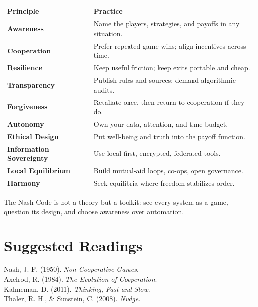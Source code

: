 \documentclass[12pt,twoside]{book}
\begin{document}
\begingroup
\small
\setlength{\tabcolsep}{6pt}
\renewcommand{\arraystretch}{1.15}

\begin{tcolorbox}[enhanced, colback=gray!5, colframe=gray!60,
  boxrule=0.4pt, arc=1mm, left=6pt, right=6pt, top=2pt, bottom=2pt,
  width=\linewidth]

\begin{tabularx}{\linewidth}{@{} >{\bfseries}l >{\raggedright\arraybackslash}X @{}}
\toprule
Principle & Practice \\
\midrule
Awareness & Name the players, strategies, and payoffs in any situation. \\
Cooperation & Prefer repeated-game wins; align incentives across time. \\
Resilience & Keep useful friction; keep exits portable and cheap. \\
Transparency & Publish rules and sources; demand algorithmic audits. \\
Forgiveness & Retaliate once, then return to cooperation if they do. \\
Autonomy & Own your data, attention, and time budget. \\
Ethical Design & Put well-being and truth into the payoff function. \\
Information Sovereignty & Use local-first, encrypted, federated tools. \\
Local Equilibrium & Build mutual-aid loops, co-ops, open governance. \\
Harmony & Seek equilibria where freedom stabilizes order. \\
\bottomrule
\end{tabularx}

\end{tcolorbox}
\endgroup

\begin{keyidea}
The Nash Code is not a theory but a toolkit: see every system as a game, question its design, and choose awareness over automation.
\end{keyidea}


\chapter*{Suggested Readings}
\noindent
Nash, J. F. (1950). \textit{Non-Cooperative Games}.\\
Axelrod, R. (1984). \textit{The Evolution of Cooperation}.\\
Kahneman, D. (2011). \textit{Thinking, Fast and Slow}.\\
Thaler, R. H., \& Sunstein, C. (2008). \textit{Nudge}.\\
\end{document}
